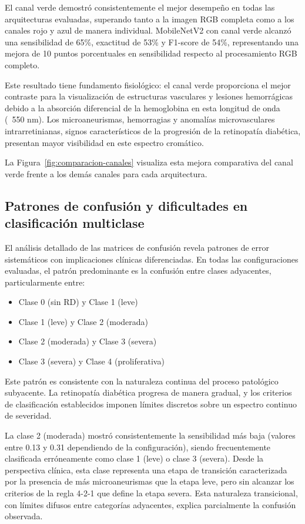 El canal verde demostró consistentemente el mejor desempeño en todas las arquitecturas 
evaluadas, superando tanto a la imagen RGB completa como a los canales rojo y azul de 
manera individual. MobileNetV2 con canal verde alcanzó una sensibilidad de 65\%, 
exactitud de 53\% y F1-score de 54\%, representando una mejora de 10 puntos porcentuales 
en sensibilidad respecto al procesamiento RGB completo.

Este resultado tiene fundamento fisiológico: el canal verde proporciona el mejor 
contraste para la visualización de estructuras vasculares y lesiones hemorrágicas debido 
a la absorción diferencial de la hemoglobina en esta longitud de onda (~550 nm). Los 
microaneurismas, hemorragias y anomalías microvasculares intrarretinianas, signos 
característicos de la progresión de la retinopatía diabética, presentan mayor visibilidad 
en este espectro cromático.

La Figura~\ref{fig:comparacion-canales} visualiza esta mejora comparativa del canal verde 
frente a los demás canales para cada arquitectura.

\subsection{Patrones de confusión y dificultades en clasificación multiclase}

El análisis detallado de las matrices de confusión revela patrones de error sistemáticos 
con implicaciones clínicas diferenciadas. En todas las configuraciones evaluadas, el 
patrón predominante es la confusión entre clases adyacentes, particularmente entre:
\begin{itemize}
    \item Clase 0 (sin RD) y Clase 1 (leve)
    \item Clase 1 (leve) y Clase 2 (moderada)
    \item Clase 2 (moderada) y Clase 3 (severa)
    \item Clase 3 (severa) y Clase 4 (proliferativa)
\end{itemize}

Este patrón es consistente con la naturaleza continua del proceso patológico subyacente. 
La retinopatía diabética progresa de manera gradual, y los criterios de clasificación 
establecidos imponen límites discretos sobre un espectro continuo de severidad.

La clase 2 (moderada) mostró consistentemente la sensibilidad más baja (valores entre 
0.13 y 0.31 dependiendo de la configuración), siendo frecuentemente clasificada 
erróneamente como clase 1 (leve) o clase 3 (severa). Desde la perspectiva clínica, esta 
clase representa una etapa de transición caracterizada por la presencia de más 
microaneurismas que la etapa leve, pero sin alcanzar los criterios de la regla 4-2-1 que 
define la etapa severa. Esta naturaleza transicional, con límites difusos entre 
categorías adyacentes, explica parcialmente la confusión observada.

